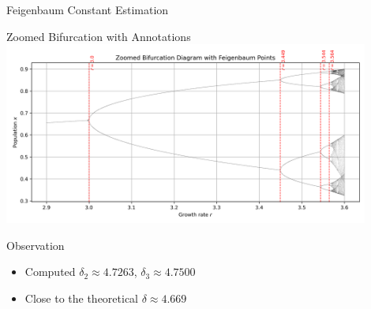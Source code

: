 \documentclass{beamer}
\begin{document}
\begin{frame}{Feigenbaum Constant Estimation}
  \begin{block}{Zoomed Bifurcation with Annotations}
    \includegraphics[width=0.9\textwidth]{../Backend/Data/feigenbaum_zoomed_labeled.png}
  \end{block}
  \begin{block}{Observation}
    \begin{itemize}
      \item Computed $\delta_2 \approx 4.7263$, $\delta_3 \approx 4.7500$
      \item Close to the theoretical $\delta \approx 4.669$
    \end{itemize}
  \end{block}
\end{frame}
\end{document}

